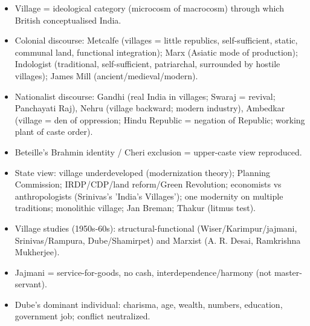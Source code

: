 \begin{QuickRevision}
\begin{itemize}
\item Village = ideological category (microcosm of macrocosm) through which British conceptualised India.
\item Colonial discourse: Metcalfe (villages = little republics, self-sufficient, static, communal land, functional integration); Marx (Asiatic mode of production); Indologist (traditional, self-sufficient, patriarchal, surrounded by hostile villages); James Mill (ancient/medieval/modern).
\item Nationalist discourse: Gandhi (real India in villages; Swaraj = revival; Panchayati Raj), Nehru (village backward; modern industry), Ambedkar (village = den of oppression; Hindu Republic = negation of Republic; working plant of caste order).
\item Beteille's Brahmin identity / Cheri exclusion = upper-caste view reproduced.
\item State view: village underdeveloped (modernization theory); Planning Commission; IRDP/CDP/land reform/Green Revolution; economists vs anthropologists (Srinivas's 'India's Villages'); one modernity on multiple traditions; monolithic village; Jan Breman; Thakur (litmus test).
\item Village studies (1950s-60s): structural-functional (Wiser/Karimpur/jajmani, Srinivas/Rampura, Dube/Shamirpet) and Marxist (A. R. Desai, Ramkrishna Mukherjee).
\item Jajmani = service-for-goods, no cash, interdependence/harmony (not master-servant).
\item Dube's dominant individual: charisma, age, wealth, numbers, education, government job; conflict neutralized.
\end{itemize}
\end{QuickRevision}

